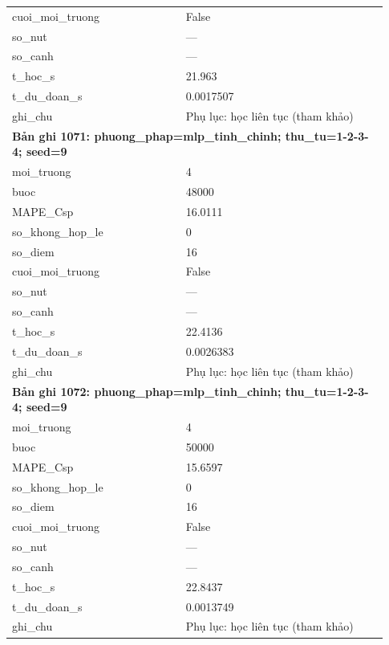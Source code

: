 \begin{longtable}{p{0.43\linewidth}p{0.50\linewidth}}
cuoi\_\allowbreak moi\_\allowbreak truong & False \\
so\_\allowbreak nut & — \\
so\_\allowbreak canh & — \\
t\_\allowbreak hoc\_\allowbreak s & 21.963 \\
t\_\allowbreak du\_\allowbreak doan\_\allowbreak s & 0.0017507 \\
ghi\_\allowbreak chu & Phụ lục: học liên tục (tham khảo) \\
\midrule
\multicolumn{2}{p{0.95\linewidth}}{\textbf{Bản ghi 1071: phuong\_phap=mlp\_tinh\_chinh; thu\_tu=1-2-3-4; seed=9}} \\
moi\_\allowbreak truong & 4 \\
buoc & 48000 \\
MAPE\_\allowbreak Csp & 16.0111 \\
so\_\allowbreak khong\_\allowbreak hop\_\allowbreak le & 0 \\
so\_\allowbreak diem & 16 \\
cuoi\_\allowbreak moi\_\allowbreak truong & False \\
so\_\allowbreak nut & — \\
so\_\allowbreak canh & — \\
t\_\allowbreak hoc\_\allowbreak s & 22.4136 \\
t\_\allowbreak du\_\allowbreak doan\_\allowbreak s & 0.0026383 \\
ghi\_\allowbreak chu & Phụ lục: học liên tục (tham khảo) \\
\midrule
\multicolumn{2}{p{0.95\linewidth}}{\textbf{Bản ghi 1072: phuong\_phap=mlp\_tinh\_chinh; thu\_tu=1-2-3-4; seed=9}} \\
moi\_\allowbreak truong & 4 \\
buoc & 50000 \\
MAPE\_\allowbreak Csp & 15.6597 \\
so\_\allowbreak khong\_\allowbreak hop\_\allowbreak le & 0 \\
so\_\allowbreak diem & 16 \\
cuoi\_\allowbreak moi\_\allowbreak truong & False \\
so\_\allowbreak nut & — \\
so\_\allowbreak canh & — \\
t\_\allowbreak hoc\_\allowbreak s & 22.8437 \\
t\_\allowbreak du\_\allowbreak doan\_\allowbreak s & 0.0013749 \\
ghi\_\allowbreak chu & Phụ lục: học liên tục (tham khảo) \\

\end{longtable}
